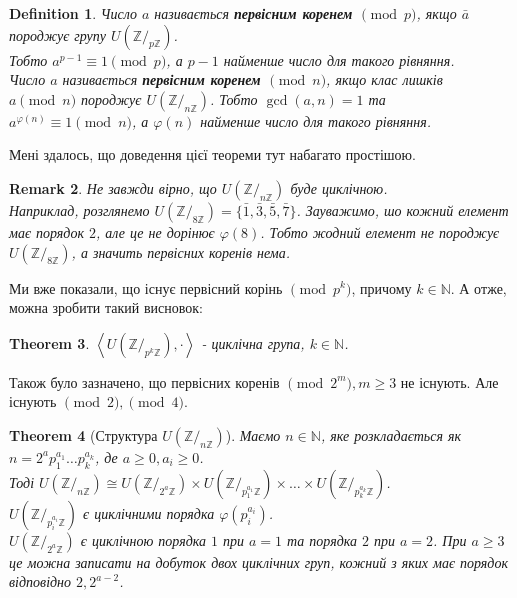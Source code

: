 \documentclass[a4paper, 14pt]{extarticle}
\theoremstyle{theoremdd}
\newtheorem{theorem}{Theorem}[subsection]
\theoremstyle{theoremdd}
\newtheorem{definition}[theorem]{Definition}
\theoremstyle{theoremdd}
\theoremstyle{theoremdd}
\theoremstyle{theoremdd}
\theoremstyle{theoremdd}
\newtheorem{remark}[theorem]{Remark}
\theoremstyle{theoremdd}
\theoremstyle{theoremdd}
\begin{document}
\begin{definition}
Число $a$ називається \textbf{первісним коренем $\pmod p$}, якщо $\bar{a}$ породжує групу $U(\mathbb{Z}/_{p\mathbb{Z}})$.\\
Тобто $a^{p-1} \equiv 1 \pmod p$, а $p-1$ найменше число для такого рівняння.
\bigskip \\
Число $a$ називається \textbf{первісним коренем $\pmod n$}, якщо клас лишків $a \pmod n$ породжує $U(\mathbb{Z}/_{n\mathbb{Z}})$. Тобто $\gcd(a,n) =1$ та $a^{\varphi(n)} \equiv 1 \pmod n$, а $\varphi(n)$ найменше число для такого рівняння.
\end{definition}

Мені здалось, що доведення цієї теореми тут набагато простішою.

\begin{remark}
Не завжди вірно, що $U(\mathbb{Z}/_{n \mathbb{Z}})$ буде циклічною.\\
Наприклад, розглянемо $U(\mathbb{Z}/_{8 \mathbb{Z}}) = \{ \bar{1}, \bar{3}, \bar{5}, \bar{7} \}$. Зауважимо, шо кожний елемент має порядок $2$, але це не дорінює $\varphi(8)$. Тобто жодний елемент не породжує $U(\mathbb{Z}/_{8 \mathbb{Z}})$, а значить первісних коренів нема.
\end{remark}

Ми вже показали, що існує первісний корінь $\pmod {p^k}$, причому $k \in \mathbb{N}$. А отже, можна зробити такий висновок:
\begin{theorem}
$\left< U(\mathbb{Z}/_{p^k \mathbb{Z}}), \cdot \right>$ - циклічна група, $k \in \mathbb{N}$.
\end{theorem}

Також було зазначено, що первісних коренів $\pmod {2^m}, m \geq 3$ не існують. Але існують $\pmod 2, \pmod 4$.

\begin{theorem}[Структура $U(\mathbb{Z}/_{n \mathbb{Z}})$]
Маємо $n \in \mathbb{N}$, яке розкладається як $n = 2^a p_1^{a_1} \dots p_k^{a_k}$, де $a \geq 0, a_i \geq 0$. \\
Тоді $U(\mathbb{Z}/_{n \mathbb{Z}}) \cong U(\mathbb{Z}/_{2^a \mathbb{Z}}) \times U(\mathbb{Z}/_{p_1^{a_1} \mathbb{Z}}) \times \dots \times U(\mathbb{Z}/_{p_k^{a_k} \mathbb{Z}})$.\\
$U(\mathbb{Z}/_{p_i^{a_i} \mathbb{Z}})$ є циклічними порядка $\varphi(p_i^{a_i})$.\\
$U(\mathbb{Z}/_{2^a \mathbb{Z}})$ є циклічною порядка $1$ при $a=1$ та порядка $2$ при $a=2$. При $a \geq 3$ це можна записати на добуток двох циклічних груп, кожний з яких має порядок відповідно $2, 2^{a-2}$.
\end{theorem}
\end{document}
